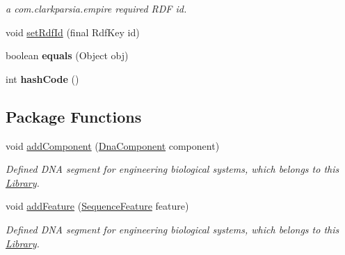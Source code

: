 \begin{DoxyCompactItemize}
\begin{DoxyCompactList}\small\item\em a com.clarkparsia.empire required RDF id. \item\end{DoxyCompactList}\item 
void \hyperlink{classorg_1_1sbolstandard_1_1lib_s_b_o_lj_1_1_library_afe8d2a1ced8871ba217ddf364366da99}{setRdfId} (final RdfKey id)
\item 
\hypertarget{classorg_1_1sbolstandard_1_1lib_s_b_o_lj_1_1_library_ae3ce8ca5a04e8966a9d2158aeeecfc16}{
boolean {\bfseries equals} (Object obj)}
\label{classorg_1_1sbolstandard_1_1lib_s_b_o_lj_1_1_library_ae3ce8ca5a04e8966a9d2158aeeecfc16}

\item 
\hypertarget{classorg_1_1sbolstandard_1_1lib_s_b_o_lj_1_1_library_a077e18fe97323c7194e2665ffc766399}{
int {\bfseries hashCode} ()}
\label{classorg_1_1sbolstandard_1_1lib_s_b_o_lj_1_1_library_a077e18fe97323c7194e2665ffc766399}

\end{DoxyCompactItemize}
\subsection*{Package Functions}
\begin{DoxyCompactItemize}
\item 
void \hyperlink{classorg_1_1sbolstandard_1_1lib_s_b_o_lj_1_1_library_a9ff983431034c861c97db6aeeecfa9c9}{addComponent} (\hyperlink{classorg_1_1sbolstandard_1_1lib_s_b_o_lj_1_1_dna_component}{DnaComponent} component)
\begin{DoxyCompactList}\small\item\em Defined DNA segment for engineering biological systems, which belongs to this \hyperlink{classorg_1_1sbolstandard_1_1lib_s_b_o_lj_1_1_library}{Library}. \item\end{DoxyCompactList}\item 
void \hyperlink{classorg_1_1sbolstandard_1_1lib_s_b_o_lj_1_1_library_a8606f263fb4a3f3d9d7265cf1d1095d3}{addFeature} (\hyperlink{classorg_1_1sbolstandard_1_1lib_s_b_o_lj_1_1_sequence_feature}{SequenceFeature} feature)
\begin{DoxyCompactList}\small\item\em Defined DNA segment for engineering biological systems, which belongs to this \hyperlink{classorg_1_1sbolstandard_1_1lib_s_b_o_lj_1_1_library}{Library}. \item\end{DoxyCompactList}\end{DoxyCompactItemize}


